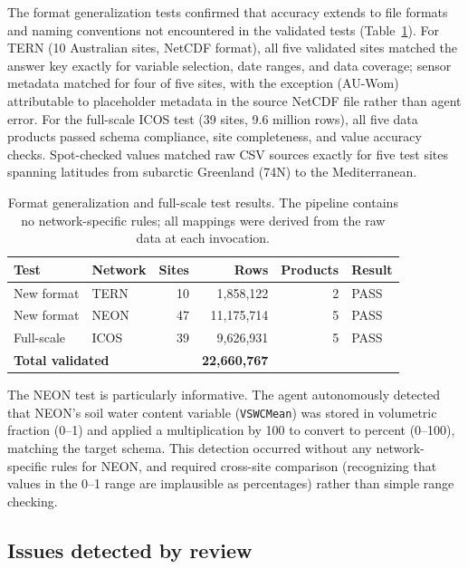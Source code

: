 \documentclass[review,authoryear]{elsarticle}
\begin{document}
The format generalization tests confirmed that accuracy extends to file formats and naming conventions not encountered in the validated tests (Table~\ref{tab:blind}). For TERN (10 Australian sites, NetCDF format), all five validated sites matched the answer key exactly for variable selection, date ranges, and data coverage; sensor metadata matched for four of five sites, with the exception (AU-Wom) attributable to placeholder metadata in the source NetCDF file rather than agent error. For the full-scale ICOS test (39 sites, 9.6 million rows), all five data products passed schema compliance, site completeness, and value accuracy checks. Spot-checked values matched raw CSV sources exactly for five test sites spanning latitudes from subarctic Greenland (74\textdegree N) to the Mediterranean.

\begin{table}[htbp]
\centering
\caption{Format generalization and full-scale test results. The pipeline contains no network-specific rules; all mappings were derived from the raw data at each invocation.}
\label{tab:blind}
\small
\begin{tabular}{llrrrl}
\toprule
Test & Network & Sites & Rows & Products & Result \\
\midrule
New format & TERN & 10 & 1{,}858{,}122 & 2 & PASS \\
New format & NEON & 47 & 11{,}175{,}714 & 5 & PASS \\
Full-scale & ICOS & 39 & 9{,}626{,}931 & 5 & PASS \\
\midrule
\multicolumn{3}{l}{\textbf{Total validated}} & \textbf{22{,}660{,}767} & & \\
\bottomrule
\end{tabular}
\end{table}

The NEON test is particularly informative. The agent autonomously detected that NEON's soil water content variable (\texttt{VSWCMean}) was stored in volumetric fraction (0--1) and applied a multiplication by 100 to convert to percent (0--100), matching the target schema. This detection occurred without any network-specific rules for NEON, and required cross-site comparison (recognizing that values in the 0--1 range are implausible as percentages) rather than simple range checking.

\subsection{Issues detected by review}
\label{sec:review-issues}
\end{document}
